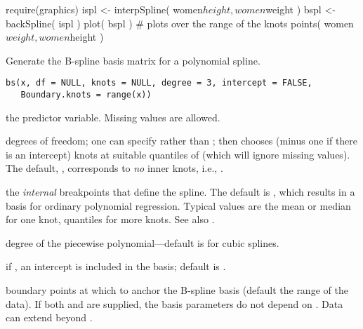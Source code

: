 %
\begin{Examples}
\begin{ExampleCode}
require(graphics)
ispl <- interpSpline( women$height, women$weight )
bspl <- backSpline( ispl )
plot( bspl )                   # plots over the range of the knots
points( women$weight, women$height )
\end{ExampleCode}
\end{Examples}
%
\begin{Description}\relax
Generate the B-spline basis matrix for a polynomial spline.
\end{Description}
%
\begin{Usage}
\begin{verbatim}
bs(x, df = NULL, knots = NULL, degree = 3, intercept = FALSE,
   Boundary.knots = range(x))
\end{verbatim}
\end{Usage}
%
\begin{Arguments}
\begin{ldescription}
\item[\code{x}] the predictor variable.  Missing values are allowed.
\item[\code{df}] degrees of freedom; one can specify  rather than
;  then chooses  (minus one
if there is an intercept) knots at suitable quantiles of 
(which will ignore missing values).  The default, ,
corresponds to \emph{no} inner knots, i.e., .
\item[\code{knots}] the \emph{internal} breakpoints that define the
spline.  The default is , which results in a basis for
ordinary polynomial regression.  Typical values are the mean or
median for one knot, quantiles for more knots.  See also
.
\item[\code{degree}] degree of the piecewise polynomial---default is  for
cubic splines.
\item[\code{intercept}] if , an intercept is included in the
basis; default is .
\item[\code{Boundary.knots}] boundary points at which to anchor the B-spline
basis (default the range of the data). If both  and
 are supplied, the basis parameters do not
depend on . Data can extend beyond .
\end{ldescription}
\end{Arguments}
